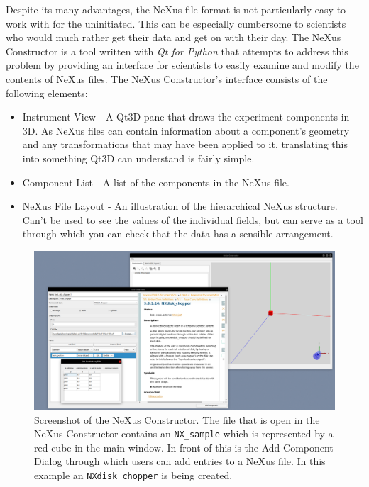 Despite its many advantages, the NeXus file format is not particularly easy to work with for the uninitiated. This can be especially cumbersome to scientists who would much rather get their data and get on with their day. The NeXus Constructor is a tool written with \textit{Qt for Python} that attempts to address this problem by providing an interface for scientists to easily examine and modify the contents of NeXus files. The NeXus Constructor's interface consists of the following elements:


\begin{itemize}
\item Instrument View - A Qt3D pane that draws the experiment components in 3D. As NeXus files can contain information about a component's geometry and any transformations that may have been applied to it, translating this into something Qt3D can understand is fairly simple.
\item Component List - A list of the components in the NeXus file.
\item NeXus File Layout - An illustration of the hierarchical NeXus structure. Can't be used to see the values of the individual fields, but can serve as a tool through which you can check that the data has a sensible arrangement.
\end{itemize}

\begin{figure}
\caption{Screenshot of the NeXus Constructor. The file that is open in the NeXus Constructor contains an \texttt{NX\_sample} which is represented by a red cube in the main window. In front of this is the Add Component Dialog through which users can add entries to a NeXus file. In this example an \texttt{NXdisk\_chopper} is being created.}
\includegraphics[width=\linewidth]{screenshot.png}
\end{figure}
